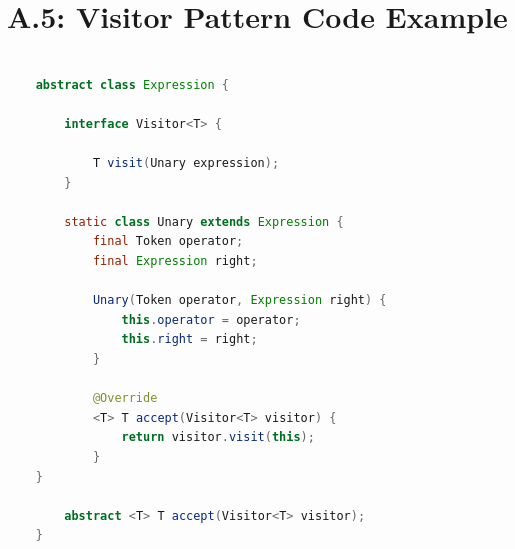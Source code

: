 \documentclass[a4paper, oneside, 11pt]{report}
\begin{document}
\clearpage
\section*{A.5: Visitor Pattern Code Example}
\begin{lstlisting}[caption = {An example of the implementation of a node---the unary expression in this case}, label = {lst:visitor}, language = Java, breaklines=true, showstringspaces=false, tabsize=2] 

	abstract class Expression {

		interface Visitor<T> {

			T visit(Unary expression);
		}

		static class Unary extends Expression {
			final Token operator;
			final Expression right;

			Unary(Token operator, Expression right) {
				this.operator = operator;
				this.right = right;
			}

			@Override
			<T> T accept(Visitor<T> visitor) {
				return visitor.visit(this);
			}
	}

		abstract <T> T accept(Visitor<T> visitor);
	}
\end{lstlisting}
\end{document}

